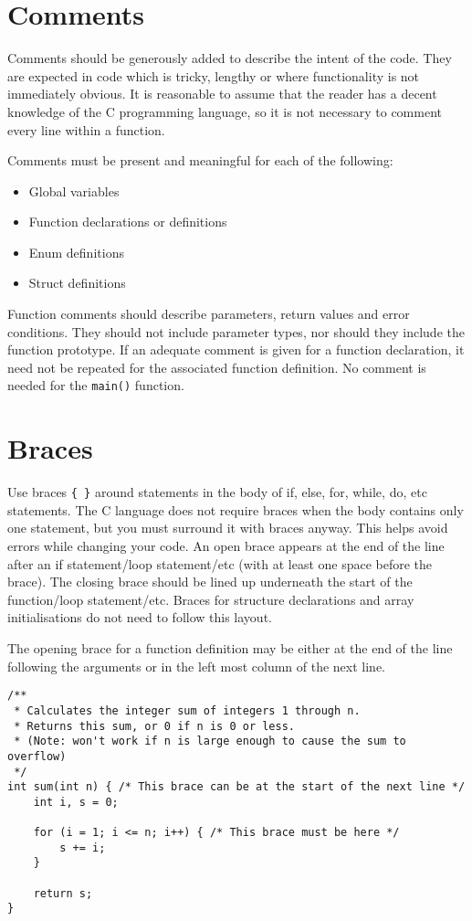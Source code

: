 \documentclass{article}
\begin{document}
\section{Comments}
Comments should be generously added to describe the intent of the code.
They are expected in code which is tricky, lengthy or where functionality is not immediately obvious.
It is reasonable to assume that the reader has a decent knowledge of the C programming language, so it is not necessary to comment every line within a function.

Comments must be present and meaningful for each of the following:
\begin{itemize}
    \item Global variables
    \item Function declarations or definitions
    \item Enum definitions
    \item Struct definitions
\end{itemize}

Function comments should describe parameters, return values and error conditions.
They should not include parameter types, nor should they include the function prototype.
If an adequate comment is given for a function declaration, it need not be repeated for the associated function definition.
No comment is needed for the \texttt{main()} function.

\clearpage
\section{Braces}
Use braces \texttt{\{ \}} around statements in the body of if, else, for, while, do, etc statements.
The C language does not require braces when the body contains only one statement, but you must surround it with braces anyway.
This helps avoid errors while changing your code.
An open brace appears at the end of the line after an if statement/loop statement/etc (with at least one space before the brace).
The closing brace should be lined up underneath the start of the function/loop statement/etc.
Braces for structure declarations and array initialisations do not need to follow this layout.

The opening brace for a function definition may be either at the end of the line following the arguments or in the left most column of the next line.

\begin{lstlisting}
/**
 * Calculates the integer sum of integers 1 through n.
 * Returns this sum, or 0 if n is 0 or less.
 * (Note: won't work if n is large enough to cause the sum to overflow)
 */
int sum(int n) { /* This brace can be at the start of the next line */
    int i, s = 0;

    for (i = 1; i <= n; i++) { /* This brace must be here */
        s += i;
    }

    return s;
}
\end{lstlisting}
\end{document}
